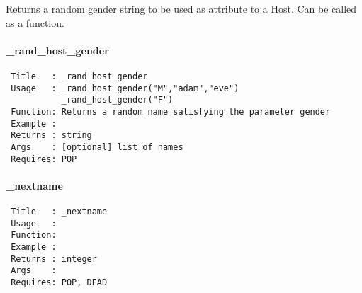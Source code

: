 Returns a random gender string to be used as attribute to a Host. Can
be called as a function.

\paragraph*{\_rand\_host\_gender\label{_rand_host_gender}}
\begin{verbatim}
 Title   : _rand_host_gender
 Usage   : _rand_host_gender("M","adam","eve")
           _rand_host_gender("F")
 Function: Returns a random name satisfying the parameter gender
 Example : 
 Returns : string
 Args    : [optional] list of names
 Requires: POP
\end{verbatim}
\paragraph*{\_nextname\label{_nextname}}
\begin{verbatim}
 Title   : _nextname
 Usage   : 
 Function: 
 Example : 
 Returns : integer
 Args    : 
 Requires: POP, DEAD
\end{verbatim}
